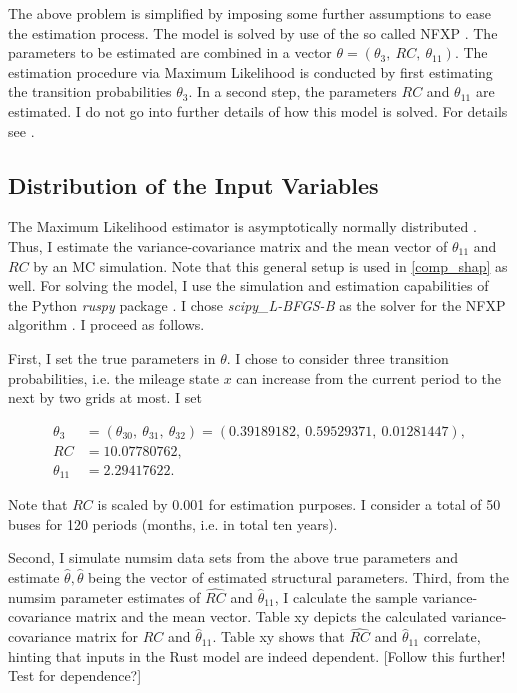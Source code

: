 The above problem is simplified by imposing some further assumptions to ease the estimation process. The model is solved by use of the so called NFXP \citep{R87}. The parameters to be estimated are combined in a vector $\theta=(\theta_3,\ RC,\ \theta_{11}) $. The estimation procedure via Maximum Likelihood is conducted by first estimating the transition probabilities $\theta_3$. In a second step, the parameters $RC$ and $\theta_{11}$ are estimated. I do not go into further details of how this model is solved. For details see \citet{R87}.

\subsection{Distribution of the Input Variables}

The Maximum Likelihood estimator is asymptotically normally distributed \citep{R73}. Thus, I estimate the variance-covariance matrix and the mean vector of $\theta_{11}$ and $RC$ by an MC simulation. Note that this general setup is used in \cref{comp_shap} as well. For solving the model, I use the simulation and estimation capabilities of the Python \textit{ruspy} package \citep{OSE19}. I chose \textit{scipy\_L-BFGS-B} as the solver for the NFXP algorithm \citep{SP20}. I proceed as follows.

First, I set the true parameters in $\theta$. I chose to consider three transition probabilities, i.e. the mileage state $x$ can increase from the current period to the next by two grids at most. I set

\begin{align*}
\theta_3 &= (\theta_{30},\ \theta_{31},\ \theta_{32})=(0.39189182,\ 0.59529371,\ 0.01281447),\\
RC &= 10.07780762,\\
\theta_{11} &= 2.29417622.
\end{align*}

\noindent Note that $RC$ is scaled by 0.001 for estimation purposes. I consider a total of 50 buses for 120 periods (months, i.e. in total ten years).

Second, I simulate numsim data sets from the above true parameters and estimate $\hat{\theta}, \hat{\theta}$ being the vector of estimated structural parameters.
Third, from the numsim parameter estimates of $\widehat{RC}$ and ${\hat{\theta}}_{11}$, I calculate the sample variance-covariance matrix and the mean vector. Table xy depicts the calculated variance-covariance matrix for $\widehat{RC}$ and ${\hat{\theta}}_{11}$. Table xy shows that $\widehat{RC}$ and ${\hat{\theta}}_{11}$ correlate, hinting that inputs in the Rust model are indeed dependent.
[Follow this further! Test for dependence?]

